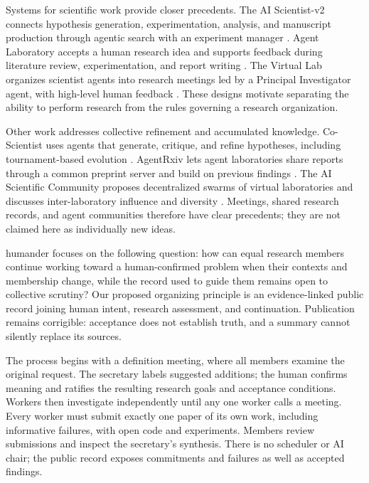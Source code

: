 \documentclass[11pt]{article}
\begin{document}
Systems for scientific work provide closer precedents. The AI Scientist-v2 connects hypothesis generation, experimentation, analysis, and manuscript production through agentic search with an experiment manager \citep{yamada2025scientist}. Agent Laboratory accepts a human research idea and supports feedback during literature review, experimentation, and report writing \citep{schmidgall2025laboratory}. The Virtual Lab organizes scientist agents into research meetings led by a Principal Investigator agent, with high-level human feedback \citep{swanson2025virtual}. These designs motivate separating the ability to perform research from the rules governing a research organization.

Other work addresses collective refinement and accumulated knowledge. Co-Scientist uses agents that generate, critique, and refine hypotheses, including tournament-based evolution \citep{gottweis2026coscientist}. AgentRxiv lets agent laboratories share reports through a common preprint server and build on previous findings \citep{schmidgall2025agentrxiv}. The AI Scientific Community proposes decentralized swarms of virtual laboratories and discusses inter-laboratory influence and diversity \citep{braganeto2026community}. Meetings, shared research records, and agent communities therefore have clear precedents; they are not claimed here as individually new ideas.

humander focuses on the following question: how can equal research members continue working toward a human-confirmed problem when their contexts and membership change, while the record used to guide them remains open to collective scrutiny? Our proposed organizing principle is an evidence-linked public record joining human intent, research assessment, and continuation. Publication remains corrigible: acceptance does not establish truth, and a summary cannot silently replace its sources.

The process begins with a definition meeting, where all members examine the original request. The secretary labels suggested additions; the human confirms meaning and ratifies the resulting research goals and acceptance conditions. Workers then investigate independently until any one worker calls a meeting. Every worker must submit exactly one paper of its own work, including informative failures, with open code and experiments. Members review submissions and inspect the secretary's synthesis. There is no scheduler or AI chair; the public record exposes commitments and failures as well as accepted findings.
\end{document}
